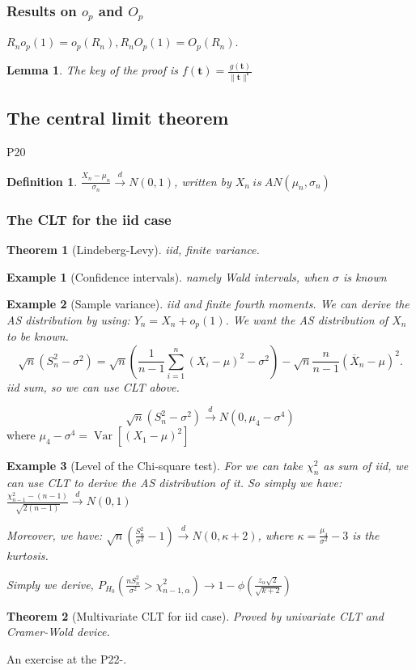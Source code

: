 \documentclass{ctexart}
\newtheorem{theorem}{Theorem}[subsection]
\newtheorem{definition}{Definition}[subsection]
\newtheorem{example}{Example}[subsection]
\newtheorem{lemma}{Lemma}[subsection]
\begin{document}
\subsubsection{Results on \(o_p\) and \(O_p\)}
\(R_no_p(1)=o_p(R_n),R_nO_p(1)=O_p(R_n)\).

\begin{lemma}
  The key of the proof is \(f(\boldsymbol{t})=\frac{g(\boldsymbol{t})}{\|\boldsymbol{t\|^r}}\) 
\end{lemma}
\subsection{The central limit theorem}
P20
\begin{definition}
  $\frac{X_n-\mu_n}{\sigma_n}\xrightarrow{d}N(0,1)$, written by \(X_n\ is\ AN(\mu_n,\sigma_n)\) 
\end{definition}
\subsubsection{The CLT for the iid case}
\begin{theorem}[Lindeberg-Levy]
  iid, finite variance.
\end{theorem}

\begin{example}[Confidence intervals]
  namely Wald intervals, when \(\sigma\) is known 
\end{example}
\begin{example}[Sample variance]
  iid and finite fourth moments. We can derive the AS distribution by using: \(Y_n=X_n+o_p(1)\). We want the AS distribution of $X_n$ to be known.
  \[
  \sqrt{n}(S_n^2-\sigma^2)=\sqrt{n}(\frac{1}{n-1}\sum_{i=1}^{n} (X_i-\mu)^2-\sigma^2)-\sqrt{n}\frac{n}{n-1}(\overline{X}_n-\mu)^2.
  \] 
  iid sum, so we can use CLT above.
\end{example}
\[
  \sqrt{n}(S_n^2-\sigma^2)\xrightarrow{d}N(0,\mu_4-\sigma^4)
\] 
where \(\mu_4-\sigma^4=\operatorname{Var}[(X_1-\mu)^2]\) 
\begin{example}[Level of the Chi-square test]
  For we can take \(\chi_n^2\) as sum of iid, we can use CLT to derive the AS distribution of it. So simply we have: \(\frac{\chi_{n-1}^2-(n-1)}{\sqrt{2(n-1)}}\xrightarrow{d}N(0,1)\)  

  Moreover, we have: \(\sqrt{n}(\frac{S_n^2}{\sigma^2}-1)\xrightarrow{d}N(0,\kappa+2)\), where \(\kappa=\frac{\mu_4}{\sigma^2}-3\) is the kurtosis. 
  
  Simply we derive, \(P_{H_0}(\frac{nS_n^2}{\sigma^2}>\chi_{n-1,\alpha}^2)\to 1-\phi(\frac{z_\alpha \sqrt{2}}{\sqrt{k+2}})\) 
\end{example}
\begin{theorem}[Multivariate CLT for iid case]
  Proved by univariate CLT and Cramer-Wold device.
\end{theorem}
An exercise at the P22-.
\end{document}
